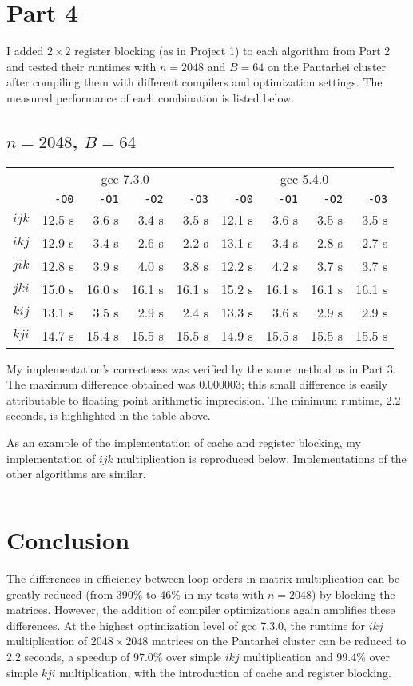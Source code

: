 \documentclass[12pt,letterpaper,oneside]{article}
\begin{document}
\newpage
\section*{Part 4}
I added $2\times2$ register blocking (as in Project 1) to each algorithm from Part 2 and tested their runtimes with $n=2048$ and $B=64$ on the Pantarhei cluster after compiling them with different compilers and optimization settings. The measured performance of each combination is listed below.
\begin{center}
	\subsection*{$n=2048$, $B=64$}
	\begin{tabular}{c | r r r r | r r r r}
		& \multicolumn{4}{c|}{gcc 7.3.0} & \multicolumn{4}{c}{gcc 5.4.0} \\
		& \texttt{-O0} & \texttt{-O1} & \texttt{-O2} & \texttt{-O3} & \texttt{-O0} & \texttt{-O1} & \texttt{-O2} & \texttt{-O3} \\
		\hline
		$ijk$ & 12.5 s & 3.6 s & 3.4 s & 3.5 s & 12.1 s & 3.6 s & 3.5 s & 3.5 s \\
		$ikj$ & 12.9 s & 3.4 s & 2.6 s & \cellcolor{yellow!50} 2.2 s & 13.1 s & 3.4 s & 2.8 s & 2.7 s \\
		$jik$ & 12.8 s & 3.9 s & 4.0 s & 3.8 s & 12.2 s & 4.2 s & 3.7 s & 3.7 s \\ 
		$jki$ & 15.0 s & 16.0 s & 16.1 s & 16.1 s & 15.2 s & 16.1 s & 16.1 s & 16.1 s \\
		$kij$ & 13.1 s & 3.5 s & 2.9 s & 2.4 s & 13.3 s & 3.6 s & 2.9 s & 2.9 s \\
		$kji$ & 14.7 s & 15.4 s & 15.5 s & 15.5 s & 14.9 s & 15.5 s & 15.5 s & 15.5 s
	\end{tabular}
\end{center}

My implementation's correctness was verified by the same method as in Part 3. The maximum difference obtained was 0.000003; this small difference is easily attributable to floating point arithmetic imprecision.
The minimum runtime, 2.2 seconds, is highlighted in the table above.

As an example of the implementation of cache and register blocking, my implementation of $ijk$ multiplication is reproduced below. Implementations of the other algorithms are similar.
\inputminted[tabsize=2,fontsize=\small]{c}{ijk4.c}

\section*{Conclusion}
The differences in efficiency between loop orders in matrix multiplication can be greatly reduced (from 390\% to 46\% in my tests with $n=2048$)
by blocking the matrices. However, the addition of compiler optimizations again amplifies these differences. At the highest optimization level of gcc 7.3.0,
the runtime for $ikj$ multiplication of $2048\times2048$ matrices on the Pantarhei cluster can be reduced
to 2.2 seconds, a speedup of 97.0\% over simple $ikj$ multiplication and 99.4\% over simple $kji$ multiplication, with the introduction of cache and register blocking.
 
\end{document}
